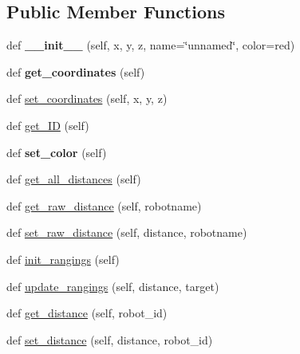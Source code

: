 \subsection*{Public Member Functions}
\begin{DoxyCompactItemize}
\item 
\mbox{\label{classanchor_1_1_anchor_a2cdcced7228de40b037b5e89b94a9873}} 
def {\bfseries \+\_\+\+\_\+init\+\_\+\+\_\+} (self, x, y, z, name=\char`\"{}unnamed\char`\"{}, color=\textquotesingle{}red\textquotesingle{})
\item 
\mbox{\label{classanchor_1_1_anchor_a89c968c83617e2fca6e64e74c6478b58}} 
def {\bfseries get\+\_\+coordinates} (self)
\item 
def \mbox{\hyperlink{classanchor_1_1_anchor_afc59fd77ac0d0375226e77947f7f6624}{set\+\_\+coordinates}} (self, x, y, z)
\item 
def \mbox{\hyperlink{classanchor_1_1_anchor_a09f3f97175c16ea6025da871f653d416}{get\+\_\+\+ID}} (self)
\item 
\mbox{\label{classanchor_1_1_anchor_a6f14d5b4ea35ecffbb402607d391ed8f}} 
def {\bfseries set\+\_\+color} (self)
\item 
def \mbox{\hyperlink{classanchor_1_1_anchor_a8497086c897585b6ee2234e8728e69e5}{get\+\_\+all\+\_\+distances}} (self)
\item 
def \mbox{\hyperlink{classanchor_1_1_anchor_aa86606ff415bcf3f0e24b2348e925496}{get\+\_\+raw\+\_\+distance}} (self, robotname)
\item 
def \mbox{\hyperlink{classanchor_1_1_anchor_a158cf339169e35c40b2b72862ff5ccf8}{set\+\_\+raw\+\_\+distance}} (self, distance, robotname)
\item 
def \mbox{\hyperlink{classanchor_1_1_anchor_acb50ac316e2abe4093f8e842635467ab}{init\+\_\+rangings}} (self)
\item 
def \mbox{\hyperlink{classanchor_1_1_anchor_a531b5973e62d6cfc80655a893b5155f2}{update\+\_\+rangings}} (self, distance, target)
\item 
def \mbox{\hyperlink{classanchor_1_1_anchor_ad92ac937236e0dcb544cf7913f436ab0}{get\+\_\+distance}} (self, robot\+\_\+id)
\item 
def \mbox{\hyperlink{classanchor_1_1_anchor_a57e1332ae74ab25661204f5fc27c92e7}{set\+\_\+distance}} (self, distance, robot\+\_\+id)
\end{DoxyCompactItemize}
